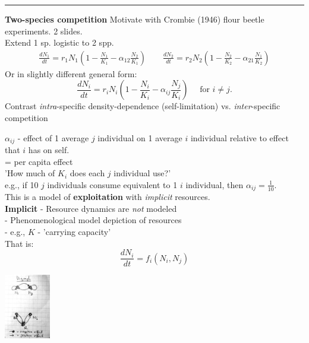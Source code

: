 \documentclass{article}
\newcommand{\note}[1]{\colorbox{gray!30}{#1}}
\newcommand{\ind}{\-\hspace{1cm}}
\begin{document}
\rule[0.5ex]{\linewidth}{2pt}

\textbf{Two-species competition} \ind \note{Motivate with Crombie (1946) flour beetle experiments. 2 slides.}\\
Extend 1 sp. logistic to 2 spp.
\begin{align*}
	\frac{dN_1}{dt}=r_1 N_1 \left (1-\frac{N_1}{K_1} - \alpha_{12}\frac{N_2}{K_1}\right) \quad \quad
	\frac{dN_2}{dt}=r_2 N_2 \left (1-\frac{N_2}{K_2} - \alpha_{21}\frac{N_1}{K_2}\right)
\end{align*}
Or in slightly different general form:
\begin{equation*}
	\frac{dN_i}{dt}=r_i N_i \left (1-\frac{N_i}{K_i} - \alpha_{ij}\frac{N_j}{K_i}\right) \quad \mbox{ for } i \neq j.
\end{equation*}
Contrast \emph{intra}-specific density-dependence (self-limitation) vs. \emph{inter}-specific competition

$\alpha_{ij}$ - effect of 1 average $j$ individual on 1 average $i$ individual relative to effect that $i$ has on self.\\
\ind \ind  = per capita effect\\
\ind \ind 'How much of $K_i$ does each $j$ individual use?'\\
\ind \ind \ind e.g., if 10 $j$ individuals consume equivalent to 1 $i$ individual, then $\alpha_{ij}=\tfrac{1}{10}$.\\

This is a model of \textbf{exploitation} with \emph{implicit} resources.\\
\textbf{Implicit} - Resource dynamics are \emph{not} modeled\\
\ind \ind - Phenomenological model depiction of resources\\
\ind \ind - e.g., $K$ - 'carrying capacity'\\
That is:
\begin{equation*}
	\frac{dN_i}{dt}=f_i(N_i,N_j)
\end{equation*}
\begin{center}
\includegraphics[width=2cm]{figs/Digraph_implicit.pdf}
\end{center}
\end{document}
